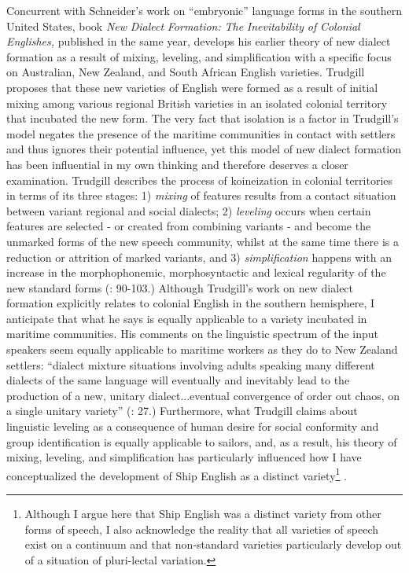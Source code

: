 Concurrent with Schneider’s work on “embryonic” language forms in the southern United States,  book \textit{New} \textit{Dialect} \textit{Formation:} \textit{The} \textit{Inevitability} \textit{of} \textit{Colonial} \textit{Englishes,} published in the same year, develops his earlier theory of new dialect formation as a result of mixing, leveling, and simplification with a specific focus on Australian, New Zealand, and South African English varieties. Trudgill proposes that these new varieties of English were formed as a result of initial mixing among various regional British varieties in an isolated colonial territory that incubated the new form. The very fact that isolation is a factor in Trudgill’s model negates the presence of the maritime communities in contact with settlers and thus ignores their potential influence, yet this model of new dialect formation has been influential in my own thinking and therefore deserves a closer examination. Trudgill describes the process of koineization in colonial territories in terms of its three stages: 1) \textit{mixing} of features results from a contact situation between variant regional and social dialects; 2) \textit{leveling} occurs when certain features are selected - or created from combining variants - and become the unmarked forms of the new speech community, whilst at the same time there is a reduction or attrition of marked variants, and 3) \textit{simplification} happens with an increase in the morphophonemic, morphosyntactic and lexical regularity of the new standard forms (\citealt{Trudgill1986}: 90-103.)  Although Trudgill’s work on new dialect formation explicitly relates to colonial English in the southern hemisphere, I anticipate that what he says is equally applicable to a variety incubated in maritime communities. His comments on the linguistic spectrum of the input speakers seem equally applicable to maritime workers as they do to New Zealand settlers: “dialect mixture situations involving adults speaking many different dialects of the same language will eventually and inevitably lead to the production of a new, unitary dialect...eventual convergence of order out chaos, on a single unitary variety” (\citealt{Trudgill2004}: 27.) Furthermore, what Trudgill claims about linguistic leveling as a consequence of human desire for social conformity and group identification is equally applicable to sailors, and, as a result, his theory of mixing, leveling, and simplification has particularly influenced how I have conceptualized the development of Ship English as a distinct variety\footnote{Although I argue here that Ship English was a distinct variety from other forms of speech, I also acknowledge the reality that all varieties of speech exist on a continuum and that non-standard varieties particularly develop out of a situation of pluri-lectal variation.} .

